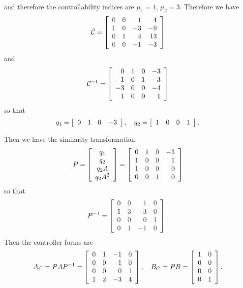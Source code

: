 \documentclass{article}
\begin{document}
and therefore the controllability indices are
$\mu_1 = 1$, $\mu_2 = 3$. Therefore we have
$$
\bar{\mathcal{C}} =
\left[\begin{array}{r r r r}
0 &  0 &  1 &  4 \\
1 &  0 & -3 & -9 \\
0 &  1 &  4 & 13 \\
0 &  0 & -1 & -3
\end{array}\right]
$$
and
$$
\bar{\mathcal{C}}^{-1} =
\left[\begin{array}{r r r r}
  0 &  1 &  0 & -3 \\
 -1 &  0 &  1 &  3 \\
 -3 &  0 &  0 & -4 \\
  1 &  0 &  0 &  1
\end{array}\right]
$$
so that
$$
q_1 =
\left[\begin{array}{r r r r}
  0 & 1 & 0 & -3
\end{array}\right], \quad
q_2 =
\left[\begin{array}{r r r r}
  1 & 0 & 0 & 1
\end{array}\right].
$$

Then we have the similarity transformation
$$
P =
\left[\begin{array}{c}
  q_1   \\
  q_2   \\
  q_2 A \\
  q_2 A^2
\end{array}\right]
=
\left[\begin{array}{r r r r}
   0 & 1 & 0 & -3 \\
   1 & 0 & 0 &  1 \\
   1 & 0 & 0 &  0 \\
   0 & 0 & 1 &  0
\end{array}\right]
$$
so that
$$
P^{-1} =
\left[\begin{array}{r r r r}
  0 & 0 &  1 & 0 \\
  1 & 3 & -3 & 0 \\
  0 & 0 &  0 & 1 \\
  0 & 1 & -1 & 0
\end{array}\right].
$$
Then the controller forms are
$$
A_C
= P A P^{-1}
= \left[\begin{array}{r r r r}
    0 & 1 & -1 & 0 \\
    0 & 0 &  1 & 0 \\
    0 & 0 &  0 & 1 \\
    1 & 2 & -3 & 4
  \end{array}\right], \quad
B_C
= P B
= \left[\begin{array}{r r}
    1 & 0 \\
    0 & 0 \\
    0 & 0 \\
    0 & 1
  \end{array}\right].
$$
\end{document}
